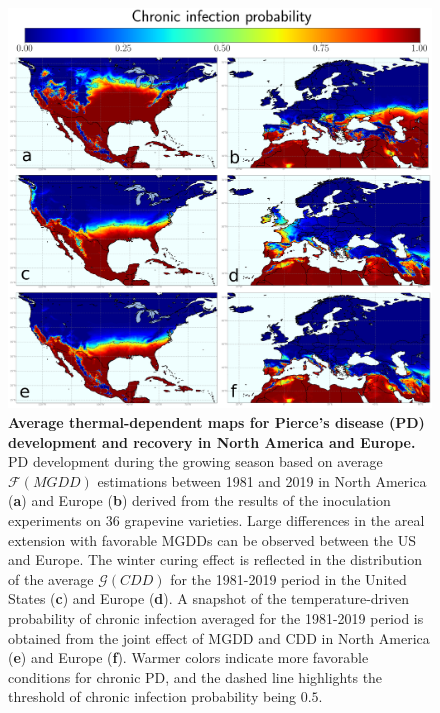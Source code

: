     \begin{figure}[H]
        \centering
        \includegraphics[width=\textwidth]{Figures/Fig2.pdf}
        \caption[Average thermal-dependent maps for Pierce's disease
            (PD) development and recovery]{\textbf{Average
                thermal-dependent maps for Pierce's disease
                (PD)
                development and recovery in North America and Europe.} PD
            development during
            the growing season based on average $\mathcal{F}(MGDD)$ estimations
            between
            1981 and 2019 in North America (\textbf{a}) and Europe (\textbf{b})
            derived
            from the results of the inoculation experiments on 36 grapevine
            varieties.
            Large differences in the areal extension with favorable MGDDs can
            be observed
            between the US and Europe. The winter curing effect is reflected in
            the
            distribution of the average $\mathcal{G}(CDD)$ for the 1981-2019
            period in the
            United States (\textbf{c}) and Europe (\textbf{d}). A snapshot of
            the
            temperature-driven probability of chronic infection averaged for
            the 1981-2019
            period is obtained from the joint effect of MGDD and CDD in North
            America
            (\textbf{e}) and Europe (\textbf{f}). Warmer colors indicate more
            favorable
            conditions for chronic PD, and the dashed line highlights the
            threshold of
            chronic infection probability being $0.5$.}
        \label{fig2}
    \end{figure}

